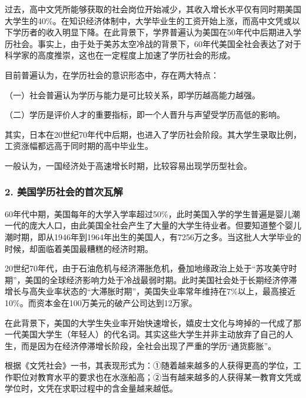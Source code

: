 {\fangsong 过去，高中文凭所能够获取的社会岗位开始减少，其收入增长水平仅有同时期美国大学生的40\%。在知识经济体制中，大学毕业生的工资开始上涨，而高中文凭或以下学历者的收入明显下降。在此背景下，学界普遍认为美国在50年代中后期进入学历社会。事实上，由于处于美苏太空冷战的背景下，60年代美国全社会表达了对于科学家的高度推崇，这也在一定程度上加速了学历社会的形成。\par}

{\fangsong 目前普遍认为，在学历社会的意识形态中，存在两大特点：\par}

{\fangsong （一）社会普遍认为学历与能力是可比较关系，即学历越高能力越强。\par}

{\fangsong （二）学历是评价人才的重要指标，即一个人晋升与声望受学历高低的影响。\par}

{\fangsong 其实，日本在20世纪70年代中后期，也进入了学历社会阶段。其大学生录取比例，工资涨幅都远高于同时期的高中毕业生。\par}

{\fangsong 一般认为，一国经济处于高速增长时期，比较容易出现学历型社会。\par}

\subsubsection{2. 美国学历社会的首次瓦解}

{\fangsong 60年代中期，美国每年的大学入学率超过50\%，此时美国入学的学生普遍是婴儿潮一代的庞大人口，由此美国全社会产生了大量的大学生待业者。但要知道整个婴儿潮时期，即从1946年到1964年出生的美国人，有7256万之多。当这批人大学毕业的时候，却面临着美国最糟糕的经济时期。\par}

{\fangsong 20世纪70年代，由于石油危机与经济滞胀危机，叠加地缘政治上处于“苏攻美守时期”，美国的全球经济影响力处于冷战最弱时期。此时美国社会处于长期经济停滞增长与高失业率状态的“大滞胀时期”，美国失业率常年维持在7\%以上，最高接近10\%。而资本金在100万美元的破产公司达到12万家。\par}

{\fangsong 在此背景下，美国的大学生失业率开始快速增长，嬉皮士文化与垮掉的一代成了那一代美国大学生（年轻人）的代名词。其实这些大学生并非主动放弃了自己的人生，而是因为在经济停滞增长阶段，全社会出现了严重的学历“通货膨胀”。\par}

{\fangsong 根据《文凭社会》一书，其表现形式为：①随着越来越多的人获得更高的学位，工作职位对教育水平的要求也在水涨船高；②当有越来越多的人获得某一教育文凭或学位时，文凭在求职过程中的含金量越来越低。\par}

